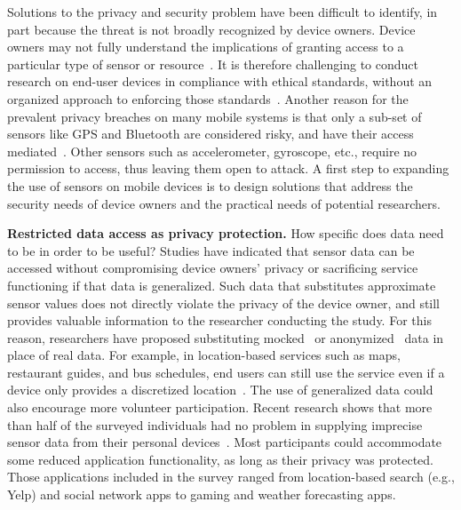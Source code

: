Solutions to the privacy and security problem have been difficult to 
identify, in part because the threat is not broadly recognized by device 
owners. Device owners may not fully 
understand the implications of granting access to a particular type of 
sensor or resource~\cite{felt2012android}. It is therefore challenging to 
conduct research on end-user devices in compliance with ethical standards, 
without an organized approach to enforcing those 
standards~\cite{zevenbergen2013ethical}. Another reason for 
the prevalent privacy breaches on many mobile systems %
is that only a sub-set of sensors like GPS and Bluetooth are considered risky, 	
and have their access mediated~\cite{android-sec}. Other sensors 
such as accelerometer, gyroscope, etc., require no permission to access, 
thus leaving them open to attack. A first step to expanding the use of sensors on mobile devices is to design solutions that address the security needs of device owners and the practical needs of potential researchers.

\textbf{Restricted data access as privacy protection.}
How specific does data need to be in order to be useful? Studies have indicated that 
sensor data can be accessed without compromising device 
owners' privacy or sacrificing service functioning if that data is generalized. 
Such data that substitutes approximate sensor values does not 
directly violate the privacy of the device owner, and still provides 
valuable information to the researcher conducting the study.
For this reason, researchers have proposed 
substituting mocked~\cite{beresford2011mockdroid} or 
anonymized~\cite{zhou2011taming} data in place of real data. 
For example, in location-based services such as maps, 
restaurant guides, and bus schedules, end users can still use the 
service even if a device only provides a discretized 
location~\cite{amini2011cache, krumm2007inference}. The use of 
generalized data could also encourage more volunteer participation. 
Recent research shows that more than half of the 
surveyed individuals had no problem in supplying imprecise 
sensor data from their personal devices~\cite{fawaz2014location}. 
Most participants could accommodate some reduced application 
functionality, as long as their privacy was protected. Those 
applications included in the survey
ranged from location-based search (e.g., Yelp) and social 
network apps to gaming and weather forecasting apps. 

